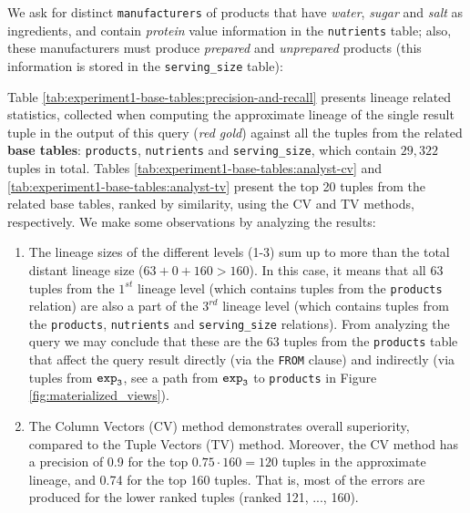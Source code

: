 \begin{experiment-withrun}\label{advanced-experiment:1}
We ask for distinct \texttt{manufacturers} of products that have \textit{water}, \textit{sugar} and \textit{salt} as  ingredients, and contain \textit{protein} value information in the \texttt{nutrients} table; also, these manufacturers must produce \textit{prepared} and \textit{unprepared} products (this information is stored in the \texttt{serving\_size} table):\footnotemark


Table \ref{tab:experiment1-base-tables:precision-and-recall} presents lineage related statistics, collected when computing the approximate lineage of the single result tuple in the output of this query (\textit{red gold}) against all the tuples from the related \textbf{base tables}: \texttt{products}, \texttt{nutrients} and \texttt{serving\_size}, which contain $29,322$ tuples in total. Tables \ref{tab:experiment1-base-tables:analyst-cv} and \ref{tab:experiment1-base-tables:analyst-tv} present the top 20 tuples from the related base tables, ranked by similarity, using the CV and TV methods, respectively. We make some observations by analyzing the results:
\begin{enumerate}
    \item The lineage sizes of the different levels (1-3) sum up to more than the total distant lineage size ($63 + 0 + 160 > 160$). In this case, it means that all 63 tuples from the $1^{st}$ lineage level (which contains tuples from the \texttt{products} relation) are also a part of the $3^{rd}$ lineage level (which contains tuples from the \texttt{products}, \texttt{nutrients} and \texttt{serving\_size} relations). From analyzing the query we may conclude that these are the 63 tuples from the \texttt{products} table that affect the query result directly (via the \texttt{FROM} clause) and indirectly (via tuples from $\texttt{exp}\sb\texttt{3}$, see a path from $\texttt{exp}\sb\texttt{3}$ to \texttt{products} in Figure \ref{fig:materialized_views}).
    \item The Column Vectors (CV) method demonstrates overall superiority, compared to the Tuple Vectors (TV) method. Moreover, the  CV method has a precision of 0.9 for the top $0.75\cdot160 = 120$ tuples in the approximate lineage, and 0.74 for the top 160 tuples. That is, most of the errors are produced for the lower ranked tuples (ranked 121, ..., 160).

\end{enumerate}
\end{experiment-withrun}
